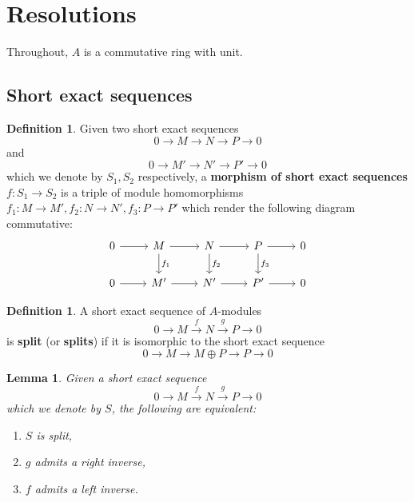 \documentclass[12pt]{article}
\theoremstyle{plain}
\newtheorem{lemma}[thm]{Lemma}
\theoremstyle{definition}
\newtheorem{defn}[thm]{Definition} %
\newcommand{\lto}{\longrightarrow}
\begin{document}
\section{Resolutions}
Throughout,  $A$ is a commutative ring with unit.
\subsection{Short exact sequences}
\begin{defn}
Given two short exact sequences
\begin{equation}
0 \lto M \lto N \lto P \lto 0
\end{equation}
and
\begin{equation}
0 \lto M' \lto N' \lto P' \lto 0
\end{equation}
which we denote by $S_1,S_2$ respectively,  a \textbf{morphism of short exact sequences} $f: S_1 \lto S_2$ is a triple of module homomorphisms $f_1: M \lto M', f_2: N \lto N', f_3: P \lto P'$ which render the following diagram commutative:
\begin{equation}
\begin{tikzcd}
0\arrow[r] & M\arrow[d,"{f_1}"]\arrow[r] & N\arrow[d,"{f_2}"]\arrow[r] & P\arrow[d,"{f_3}"]\arrow[r] & 0\\
0\arrow[r] & M'\arrow[r] & N'\arrow[r] & P'\arrow[r] & 0
\end{tikzcd}
\end{equation}
\end{defn}
\begin{defn}
A short exact sequence of $A$-modules
\begin{equation}
0 \lto M \stackrel{f}{\lto} N \stackrel{g}{\lto} P \lto 0
\end{equation}
is \textbf{split} (or \textbf{splits}) if it is isomorphic to the short exact sequence
\begin{equation}
0 \lto M \lto M \oplus P \lto P \lto 0
\end{equation}
\end{defn}
\begin{lemma}
Given a short exact sequence
\begin{equation}
0 \lto M \stackrel{f}{\lto} N \stackrel{g}{\lto} P \lto 0
\end{equation}
which we denote by $S$, the following are equivalent:
\begin{enumerate}
\item\label{lem:split} $S$ is split,
\item\label{lem:right_inverse} $g$ admits a right inverse,
\item\label{lem:leftright_inverse} $f$ admits a left inverse.
\end{enumerate}
\end{lemma}
\end{document}
